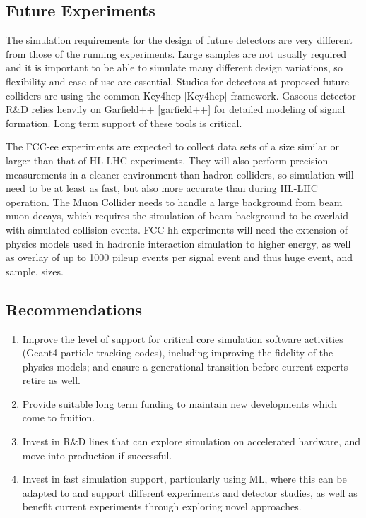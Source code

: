 \subsection{Future Experiments}\label{future-experiments}

The simulation requirements for the design of future detectors are very
different from those of the running experiments. Large samples are not
usually required and it is important to be able to simulate many
different design variations, so flexibility and ease of use are
essential. Studies for detectors at proposed future colliders are using
the common Key4hep {[}Key4hep{]} framework. Gaseous detector R\&D relies
heavily on Garfield++ {[}garfield++{]} for detailed modeling of signal
formation. Long term support of these tools is critical.

The FCC-ee experiments are expected to collect data sets of a size
similar or larger than that of HL-LHC experiments. They will also
perform precision measurements in a cleaner environment than hadron
colliders, so simulation will need to be at least as fast, but also more
accurate than during HL-LHC operation. The Muon Collider needs to handle
a large background from beam muon decays, which requires the simulation
of beam background to be overlaid with simulated collision events.
FCC-hh experiments will need the extension of physics models used in
hadronic interaction simulation to higher energy, as well as overlay of
up to 1000 pileup events per signal event and thus huge event, and
sample, sizes.

\subsection{Recommendations}\label{recommendations-1}

\begin{enumerate}
\def\labelenumi{\arabic{enumi}.}
\item
  Improve the level of support for critical core simulation software
  activities (Geant4 particle tracking codes), including improving the
  fidelity of the physics models; and ensure a generational transition
  before current experts retire as well.
\item
  Provide suitable long term funding to maintain new developments which
  come to fruition.
\item
  Invest in R\&D lines that can explore simulation on accelerated
  hardware, and move into production if successful.
\item
  Invest in fast simulation support, particularly using ML, where this
  can be adapted to and support different experiments and detector
  studies, as well as benefit current experiments through exploring
  novel approaches.
\end{enumerate}


